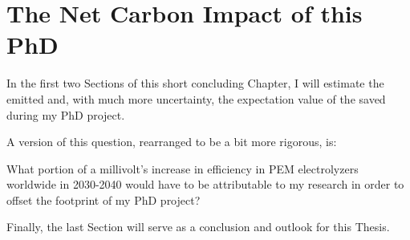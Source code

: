 

\chapter{The Net Carbon Impact of this PhD}\label{ch:impact}

In the first two Sections of this short concluding Chapter, I will estimate the  emitted and, with much more uncertainty, the expectation value of the  saved during my PhD project.

A version of this question, rearranged to be a bit more rigorous, is:
\begin{question}
	What portion of a millivolt's increase in efficiency in PEM electrolyzers worldwide in 2030-2040 would have to be attributable to my research in order to offset the  footprint of my PhD project?
\end{question}

Finally, the last Section will serve as a conclusion and outlook for this Thesis.

\label{sec:burning}


\label{sec:millivolt}


\label{sec:conclusion}